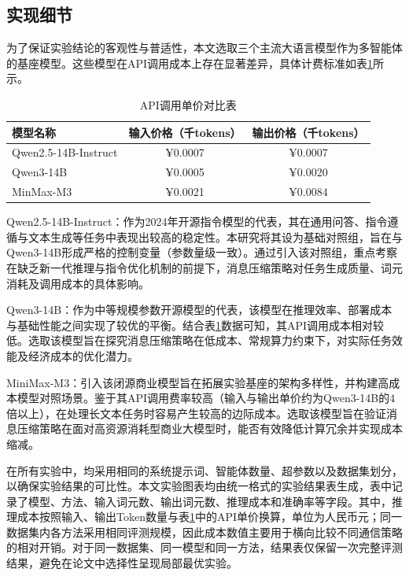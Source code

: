 \subsection{实现细节}
为了保证实验结论的客观性与普适性，本文选取三个主流大语言模型作为多智能体的基座模型。这些模型在API调用成本上存在显著差异，具体计费标准如表\ref{tab:base_model_api_price}所示。
\vspace{26pt}
\begin{table}[H]
    \centering
    {
        \fontsize{12pt}{26pt}\selectfont
        \begin{tabular}{|l|c|c|}
            \hline
            模型名称 & 输入价格（千tokens） & 输出价格（千tokens）\\
            \hline
            Qwen2.5-14B-Instruct  & ¥0.0007 & ¥0.0007 \\
            \hline
            Qwen3-14B  & ¥0.0005 & ¥0.0020 \\
            \hline
            MinMax-M3  & ¥0.0021 & ¥0.0084 \\
            \hline

        \end{tabular}
    }
    \caption{API调用单价对比表}
    \label{tab:base_model_api_price}
\end{table}

Qwen2.5-14B-Instruct：作为2024年开源指令模型的代表，其在通用问答、指令遵循与文本生成等任务中表现出较高的稳定性。本研究将其设为基础对照组，旨在与Qwen3-14B形成严格的控制变量（参数量级一致）。通过引入该对照组，重点考察在缺乏新一代推理与指令优化机制的前提下，消息压缩策略对任务生成质量、词元消耗及调用成本的具体影响。

Qwen3-14B：作为中等规模参数开源模型的代表，该模型在推理效率、部署成本与基础性能之间实现了较优的平衡。结合表\ref{tab:base_model_api_price}数据可知，其API调用成本相对较低。选取该模型旨在探究消息压缩策略在低成本、常规算力约束下，对实际任务效能及经济成本的优化潜力。

MiniMax-M3：引入该闭源商业模型旨在拓展实验基座的架构多样性，并构建高成本模型对照场景。鉴于其API调用费率较高（输入与输出单价约为Qwen3-14B的4倍以上），在处理长文本任务时容易产生较高的边际成本。选取该模型旨在验证消息压缩策略在面对高资源消耗型商业大模型时，能否有效降低计算冗余并实现成本缩减。

在所有实验中，均采用相同的系统提示词、智能体数量、超参数以及数据集划分，以确保实验结果的可比性。本文实验图表均由统一格式的实验结果表生成，表中记录了模型、方法、输入词元数、输出词元数、推理成本和准确率等字段。其中，推理成本按照输入、输出Token数量与表\ref{tab:base_model_api_price}中的API单价换算，单位为人民币元；同一数据集内各方法采用相同评测规模，因此成本数值主要用于横向比较不同通信策略的相对开销。对于同一数据集、同一模型和同一方法，结果表仅保留一次完整评测结果，避免在论文中选择性呈现局部最优实验。

